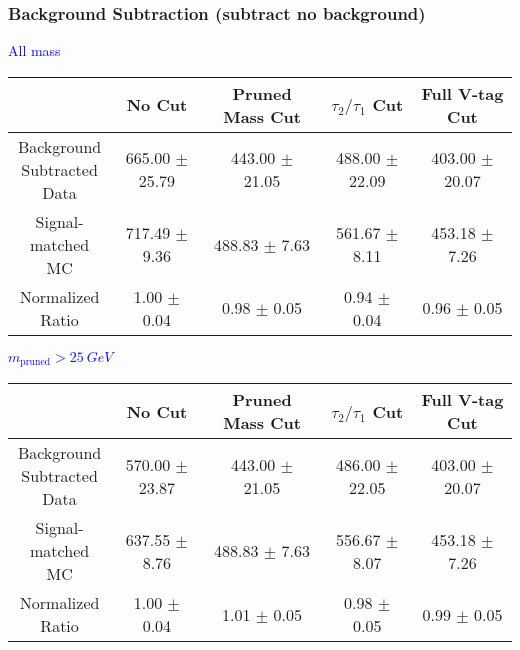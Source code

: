 \documentclass{beamer}
\begin{document}
\begin{frame}
  \frametitle{Background Subtraction (subtract no background)}
  \begin{adjustwidth}{-1.5em}{-1.5em}
    \centering
    \vspace{6pt}
    \textcolor{blue}{All mass}
    \vspace{6pt}

    {\scriptsize
      \begin{tabular}{c | c | c | c | c}
\hline
 & No Cut & Pruned Mass Cut & $\tau_2/\tau_1$ Cut & Full V-tag Cut \\
\hline
\makecell{Background \\ Subtracted \\ Data} & 665.00 $\pm$ 25.79 & 443.00 $\pm$ 21.05 & 488.00 $\pm$ 22.09 & 403.00 $\pm$ 20.07 \\
\makecell{Signal-\\ matched MC} & 717.49 $\pm$ 9.36 & 488.83 $\pm$ 7.63 & 561.67 $\pm$ 8.11 & 453.18 $\pm$ 7.26 \\
\hline
\makecell{Normalized \\ Ratio} & 1.00 $\pm$ 0.04 & 0.98 $\pm$ 0.05 & 0.94 $\pm$ 0.04 & 0.96 $\pm$ 0.05 \\
\hline
      \end{tabular}
    }

    \vspace{6pt}
    \textcolor{blue}{$m_\text{pruned} > \SI{25}{GeV}$}
    \vspace{6pt}

    {\scriptsize
      \begin{tabular}{c | c | c | c | c}
\hline
 & No Cut & Pruned Mass Cut & $\tau_2/\tau_1$ Cut & Full V-tag Cut \\
\hline
\makecell{Background \\ Subtracted \\ Data} & 570.00 $\pm$ 23.87 & 443.00 $\pm$ 21.05 & 486.00 $\pm$ 22.05 & 403.00 $\pm$ 20.07 \\
\makecell{Signal-\\ matched MC} & 637.55 $\pm$ 8.76 & 488.83 $\pm$ 7.63 & 556.67 $\pm$ 8.07 & 453.18 $\pm$ 7.26 \\
\hline
\makecell{Normalized \\ Ratio} & 1.00 $\pm$ 0.04 & 1.01 $\pm$ 0.05 & 0.98 $\pm$ 0.05 & 0.99 $\pm$ 0.05 \\
\hline
      \end{tabular}
    }
  \end{adjustwidth}
\end{frame}
\end{document}
